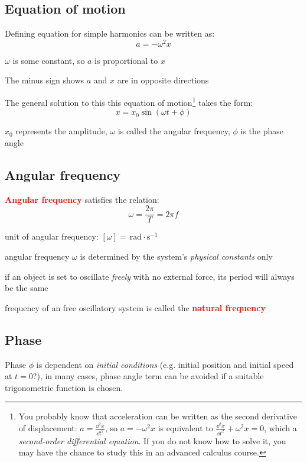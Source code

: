 \documentclass[a4paper,12pt]{book}
\newcommand{\cmt}{}
\newcommand{\keypoint}[1]{\textbf{\textcolor{red}{#1}}}
\newcommand{\rad}{\,\text{rad}}
\newcommand{\tcbhighmath}[1]{\boxed{#1}}
\newcommand{\keypoint}[1]{\textbf{\textcolor{red}{#1}}}
\newcommand{\cmt}{}
\begin{document}
\subsection{Equation of motion}

Defining equation for simple harmonics can be written as: $$\tcbhighmath{a=-\omega^2 x}$$

$\omega$ is some constant, so $a$ is proportional to $x$

The minus sign shows $a$ and $x$ are in opposite directions

\vspace*{\baselineskip} 

The general solution to this this equation of motion\footnote{You probably know that acceleration can be written as the second derivative of displacement: $a=\frac{\dd^2 x}{\dd t^2}$, so $a=-\omega^2 x$ is equivalent to $\frac{\dd^2 x}{\dd t^2} + \omega^2 x = 0$, which a \emph{second-order differential equation}. If you do not know how to solve it, you may have the chance to study this in an advanced calculus course.} takes the form: $$\tcbhighmath{x=x_0\sin(\omega t+\phi)}$$

$x_0$ represents the amplitude, $\omega$ is called the angular frequency, $\phi$ is the phase angle

\subsection*{Angular frequency}

\cmt \keypoint{Angular frequency}  satisfies the relation: $$\tcbhighmath{\omega=\frac{2\pi}{T}=2\pi f}$$

\cmt unit of angular frequency: $[\omega] = \rad\cdot\text{s}^{-1}$

\cmt angular frequency $\omega$ is determined by the system's \emph{physical constants} only

if an object is set to oscillate \emph{freely} with no external force, its period will always be the same

frequency of an free oscillatory system is called the \keypoint{natural frequency}

\subsection*{Phase}

Phase $\phi$ is dependent on \emph{initial conditions} (e.g. initial position and initial speed at $t=0$?), in many cases, phase angle term can be avoided if a suitable trigonometric function is chosen.
\end{document}
